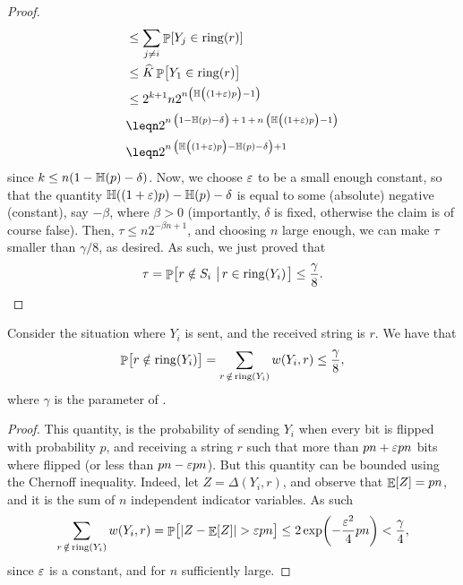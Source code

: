 \begin{proof}
\begin{align*}
      &\leq%
        \sum_{j\ne i} \Prob{ Y_j \in \bring{r}}\\
      &\leq%
        \widehat{K} \Prob{\bigl. Y_1 \in \bring{r}}\\
      &\leq%
        2^{k+1} n 2^{n \pth[]{\mBigB \EntropyX{ \mBigA (1+\eps)p } -1 }}\\
      &\leq%
        n 2^{n\,\pth[]{ \mBigB 1-\EntropyX{p} - \delta} \, +\, 1 \,+
        \, {n \,\pth[]{ \EntropyX{ \mBigA (1+\eps)p } -1 }}}\\
      &\leq%
        n 2^{ n\,\pth[]{\mBigB \EntropyX{ \mBigA (1+\eps)p } -
        \EntropyX{p} - \delta}+1}
    \end{align*}
    since $k\leq n(1-\Entropy{p} - \delta)$. Now, we choose ${\varepsilon}$ to
    be a small enough constant, so that the quantity
    $\Entropy{\MakeSBig (1+\eps)p } -\Entropy{ \MakeSBig p} - \delta$
    is equal to some (absolute) negative (constant), say $-\beta$,
    where $\beta > 0$ (importantly, $\delta$ is fixed, otherwise the
    claim is of course false). Then, $\tau \leq n2^{-\beta n +1 }$,
    and choosing $n$ large enough, we can make $\tau$ smaller than
    $\gamma/8$, as desired. As such, we just proved that
    \begin{equation*}
        \tau = \Prob{ r \notin S_i \sep{ r \in \bring{Y_i} }} \leq
        \frac{\gamma}{8}.
    \end{equation*}
\end{proof}


\begin{lemma}
    Consider the situation where $Y_i$ is sent, and the received
    string is $r$.  We have that
    \begin{equation*}
        \Prob{ \bigl. r \notin \bring{Y_i}}%
        =%
        \sum_{r \,\notin\, \sring{Y_i}}
        w(Y_i, r) \leq \frac{\gamma}{8},
    \end{equation*}
    where $\gamma$ is the parameter of .
\end{lemma}
\begin{proof}
    This quantity, is the probability of sending $Y_i$ when every bit
    is flipped with probability $p$, and receiving a string $r$ such
    that more than $p n + {\varepsilon} p n$ bits where flipped (or less than
    $p n - {\varepsilon} p n$). But this quantity can be bounded using the
    Chernoff inequality. Indeed, let $Z = \Delta(Y_i, r)$, and observe
    that $\mathop{\mathbb{E}}\!\left[ {Z} \right] = pn$, and it is the sum of $n$ independent indicator
    variables. As such
    \begin{equation*}
        \sum_{r\,\notin\, \sring{Y_i}} w(Y_i, r)%
        =%
        \Prob{ \bigl. \cardin{Z - \Ex{Z}} > \eps p n} \leq 2 \exp
        \pth { -\frac{\eps^2}{4} p n}%
        <%
        \frac{\gamma}{4},
    \end{equation*}
    since ${\varepsilon}$ is a constant, and for $n$ sufficiently large.
\end{proof}

